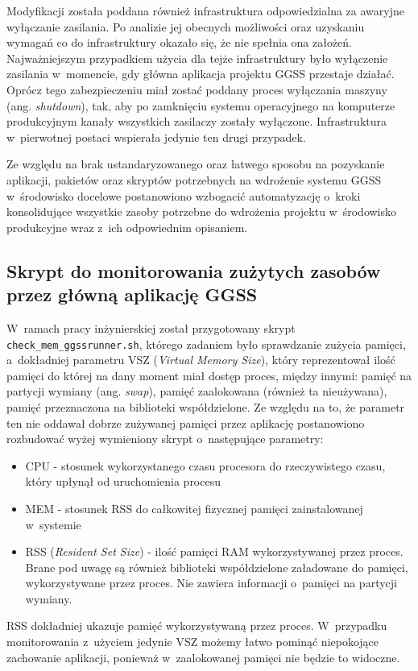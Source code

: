 Modyfikacji została poddana również infrastruktura odpowiedzialna za awaryjne wyłączanie zasilania. Po analizie jej obecnych możliwości oraz uzyskaniu wymagań co do infrastruktury okazało się, że nie spełnia ona założeń. Najważniejszym przypadkiem użycia dla tejże infrastruktury było wyłączenie zasilania w~momencie, gdy główna aplikacja projektu GGSS przestaje działać. Oprócz tego zabezpieczeniu miał zostać poddany proces wyłączania maszyny (ang. \emph{shutdown}), tak, aby po zamknięciu systemu operacyjnego na komputerze produkcyjnym kanały wszystkich zasilaczy zostały wyłączone. Infrastruktura w~pierwotnej postaci wspierała jedynie ten drugi przypadek.

Ze względu na brak ustandaryzowanego oraz łatwego sposobu na pozyskanie aplikacji, pakietów oraz skryptów potrzebnych na wdrożenie systemu GGSS w~środowisko docelowe postanowiono wzbogacić automatyzację o~kroki konsolidujące wszystkie zasoby potrzebne do wdrożenia projektu w~środowisko produkcyjne wraz z~ich odpowiednim opisaniem.

\subsection{Skrypt do monitorowania zużytych zasobów przez główną aplikację GGSS}
W~ramach pracy inżynierskiej został przygotowany skrypt \lstinline{check_mem_ggssrunner.sh}, którego zadaniem było sprawdzanie zużycia pamięci, a~dokładniej parametru VSZ (\emph{Virtual Memory Size}), który reprezentował ilość pamięci do której na dany moment miał dostęp proces, między innymi: pamięć na partycji wymiany (ang. \emph{swap}), pamięć zaalokowana (również ta nieużywana), pamięć przeznaczona na biblioteki współdzielone. Ze względu na to, że parametr ten nie oddawał dobrze zużywanej pamięci przez aplikację postanowiono rozbudować wyżej wymieniony skrypt o~następujące parametry:
\begin{itemize}
    \item CPU - stosunek wykorzystanego czasu procesora do rzeczywistego czasu, który upłynął od uruchomienia procesu
    \item MEM - stosunek RSS do całkowitej fizycznej pamięci zainstalowanej w~systemie
    \item RSS (\emph{Resident Set Size}) - ilość pamięci RAM wykorzystywanej przez proces. Brane pod uwagę są również biblioteki współdzielone załadowane do pamięci, wykorzystywane przez proces. Nie zawiera informacji o~pamięci na partycji wymiany. \cite{rssvsz}
\end{itemize}
RSS dokładniej ukazuje pamięć wykorzystywaną przez proces. W~przypadku monitorowania z~użyciem jedynie VSZ możemy łatwo pominąć niepokojące zachowanie aplikacji, ponieważ w~zaalokowanej pamięci nie będzie to widoczne.

